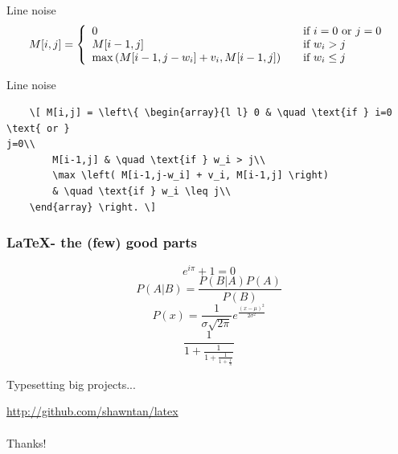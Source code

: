 \begin{frame}[fragile]{Line noise}
	\[ M[i,j] = \left\{ \begin{array}{l l} 0 & \quad \text{if } i=0 \text{ or } 
j=0\\ M[i-1,j] & \quad \text{if } w_i > j\\ \max \left( M[i-1,j-w_i] + v_i, 
M[i-1,j] \right)& \quad \text{if } w_i \leq j\\ \end{array} \right. \]
\end{frame}
\begin{frame}[fragile]{Line noise}
	\begin{verbatim}
	\[ M[i,j] = \left\{ \begin{array}{l l} 0 & \quad \text{if } i=0 \text{ or } 
j=0\\
		M[i-1,j] & \quad \text{if } w_i > j\\
		\max \left( M[i-1,j-w_i] + v_i, M[i-1,j] \right)
		& \quad \text{if } w_i \leq j\\
	\end{array} \right. \]
	\end{verbatim}%
\end{frame}


\begin{frame}[allowframebreaks]
	\frametitle{\LaTeX - the (few) good parts}
	\huge
	\[e^{i\pi} + 1 = 0\]
	\framebreak
\[P(A|B) = \frac{P(B|A)P(A)}{P(B)}\]
\framebreak
\[
	P(x) = \frac{1}{{\sigma \sqrt {2\pi } }}e^{\frac{(x-\mu)^2}{2\sigma^2}}
\]
\framebreak
\[
	\frac{1}{\displaystyle 1+  \frac{1}{\displaystyle 1+ \frac{1}{\displaystyle 1+ \frac{1}{\pi}}}}
\]
\end{frame}
\begin{frame}
Typesetting big projects...
\end{frame}



\begin{frame}
\url{http://github.com/shawntan/latex}\\
~\\
\huge Thanks!
\end{frame}

